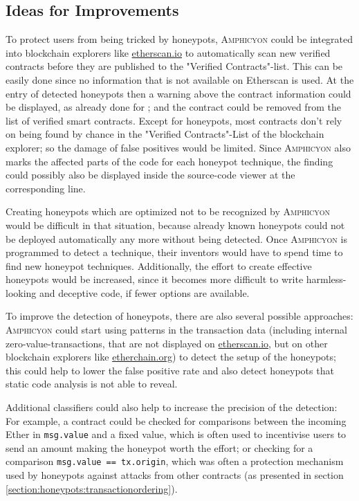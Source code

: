 \subsection{Ideas for Improvements}
To protect users from being tricked by honeypots, \textsc{Amphicyon} could be integrated into blockchain explorers like \url{etherscan.io} to automatically scan new verified contracts before they are published to the "Verified Contracts"-list. This can be easily done since no information that is not available on Etherscan is used. At the entry of detected honeypots then a warning above the contract information could be displayed, as already done for \cite{etherscan:uncalledcallhoneypot}; and the contract could be removed from the list of verified smart contracts. Except for honeypots, most contracts don't rely on being found by chance in the "Verified Contracts"-List of the blockchain explorer; so the damage of false positives would be limited. Since \textsc{Amphicyon} also marks the affected parts of the code for each honeypot technique, the finding could possibly also be displayed inside the source-code viewer at the corresponding line.

Creating honeypots which are optimized not to be recognized by \textsc{Amphicyon} would be difficult in that situation, because already known honeypots could not be deployed automatically any more without being detected. Once \textsc{Amphicyon} is programmed to detect a technique, their inventors would have to spend time to find new honeypot techniques. Additionally, the effort to create effective honeypots would be increased, since it becomes more difficult to write harmless-looking and deceptive code, if fewer options are available.

To improve the detection of honeypots, there are also several possible approaches:
\textsc{Amphicyon} could start using patterns in the transaction data (including internal zero-value-transactions, that are not displayed on \url{etherscan.io}, but on other blockchain explorers like \url{etherchain.org}) to detect the setup of the honeypots; this could help to lower the false positive rate and also detect honeypots that static code analysis is not able to reveal.

Additional classifiers could also help to increase the precision of the detection: For example, a contract could be checked for comparisons between the incoming Ether in \texttt{msg.value} and a fixed value, which is often used to incentivise users to send an amount making the honeypot worth the effort; or checking for a comparison \texttt{msg.value == tx.origin}, which was often a protection mechanism used by honeypots against attacks from other contracts (as presented in section \ref{section:honeypots:transactionordering}).

